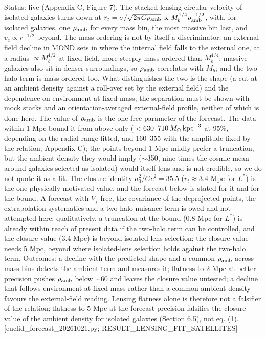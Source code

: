 \documentclass[
  10pt,
]{article}
\begin{document}
Status: live (Appendix C, Figure 7). The stacked
lensing circular velocity of isolated galaxies turns down at
$r_t=\sigma/\sqrt{2\pi G\rho_{\rm amb}}\propto M_b^{1/4}\rho_{\rm amb}^{-1/2}$, with, for isolated galaxies, one $\rho_{\rm amb}$ for every mass bin, the most massive bin last, and
$v_c\propto r^{-1/2}$ beyond. The mass ordering is not by itself a discriminator: an external-field decline in MOND sets in where the internal field falls to the external one, at a radius $\propto M_b^{1/2}$ at fixed field, more steeply mass-ordered than $M_b^{1/4}$; massive galaxies also sit in denser surroundings, so $\rho_{\rm amb}$ correlates with $M_b$; and the two-halo term is mass-ordered too. What distinguishes the two is the shape (a cut at an ambient density against a roll-over set by the external field) and the dependence on environment at fixed mass; the separation must be shown with mock stacks and an orientation-averaged external-field profile, neither of which is done here.
The value of $\rho_{\rm amb}$ is the one free parameter of the forecast. The data within 1 Mpc bound it from above only ($<630$--$710\,M_\odot\,{\rm kpc}^{-3}$ at 95\%, depending on the radial range fitted, and 160--355 with the amplitude fixed by the relation; Appendix C); the points beyond 1 Mpc mildly prefer a truncation, but the ambient density they would imply ($\sim$350, nine times the cosmic mean around galaxies selected as isolated) would itself lens and is not credible, so we do not quote it as a fit. The closure identity $a_0^2/Gc^2=35.5$ ($r_t\approx3.4$ Mpc for $L^*$) is the one physically motivated value, and the forecast below is stated for it and for the bound.
A forecast with $V_f$ free, the covariance of the deprojected points, the extrapolation systematics and a two-halo nuisance term is owed and not attempted here; qualitatively, a truncation at the bound (0.8 Mpc for $L^*$) is already within reach of present data if the two-halo term can be controlled, and the closure value (3.4 Mpc) is beyond isolated-lens selection; the closure value needs 5 Mpc, beyond where
isolated-lens selection holds against the two-halo term. Outcomes: a decline with the predicted shape and a common $\rho_{\rm amb}$ across mass bins detects the ambient term and measures it; flatness to 2 Mpc at better precision pushes $\rho_{\rm amb}$ below $\sim$60 and leaves the closure value untested; a decline that follows environment at fixed mass rather than a common ambient density favours the external-field reading. Lensing flatness alone is therefore not a falsifier of the relation; flatness to 5 Mpc at the forecast precision falsifies the closure value of the ambient density for isolated galaxies (Section 6.5), not eq. (1). {[}euclid\_forecast\_20261021.py;
RESULT\_LENSING\_FIT\_SATELLITES{]}
\end{document}
